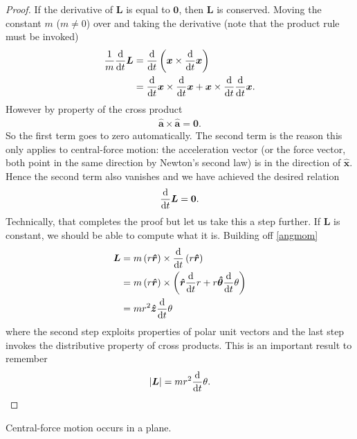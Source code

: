 \begin{proof}
If the derivative of $\bm L$ is equal to $\bm 0$, then $\bm L$ is conserved. Moving the constant $m$ ($m \neq 0$) over and taking the derivative (note that the product rule must be invoked)
\begin{align}
    \frac{1}{m}\frac{\mathrm{d}}{\mathrm{d}t}{\bm L} &= \frac{\mathrm{d}}{\mathrm{d}t}\left(\bm{x} \times \frac{\mathrm{d}}{\mathrm{d}t}{\bm x}\right) \\
    &= \frac{\mathrm{d}}{\mathrm{d}t}{\bm x}\times \frac{\mathrm{d}}{\mathrm{d}t}{\bm x} + \bm{x} \times \frac{\mathrm{d}}{\mathrm{d}t}\frac{\mathrm{d}}{\mathrm{d}t}{\bm x}. \\
\end{align}
However by property of the cross product 
\begin{align} \label{selfcross}
    \bm{\hat{a}} \times \bm{\hat{a}} = \bm 0.
\end{align} So the first term goes to zero automatically. The second term is the reason this only applies to central-force motion: the acceleration vector (or the force vector, both point in the same direction by Newton's second law) is in the direction of $\bm{\hat{x}}$. Hence the second term also vanishes and we have achieved the desired relation 
\begin{equation}
    \frac{\mathrm{d}}{\mathrm{d}t}{\bm L} = \bm 0.
\end{equation}
Technically, that completes the proof but let us take this a step further. If $\bm L$ is constant, we should be able to compute what it is. Building off \ref{angmom}
\begin{align} \label{expandL}
    \bm L &= m \left(r \bm{\hat{r}}\right) \times \frac{\mathrm{d}}{\mathrm{d}t}\left(r\bm{\hat{r}}\right) \\
    &= m \left(r \bm{\hat{r}}\right) \times \left(\bm{\hat{r}} \frac{\mathrm{d}}{\mathrm{d}t}{r} + r\bm{\hat{\theta}}\frac{\mathrm{d}}{\mathrm{d}t}{\theta} \right) \\
    &= m r^2\bm{\hat{z}}\frac{\mathrm{d}}{\mathrm{d}t}{\theta}
\end{align}
where the second step exploits properties of polar unit vectors and the last step invokes the distributive property of cross products. This is an important result to remember 
\begin{equation}
    \left|\bm{L}\right| = m r^2\frac{\mathrm{d}}{\mathrm{d}t}{\theta}.
\end{equation}
\end{proof}
\begin{lemma}
Central-force motion occurs in a plane. 
\end{lemma}
